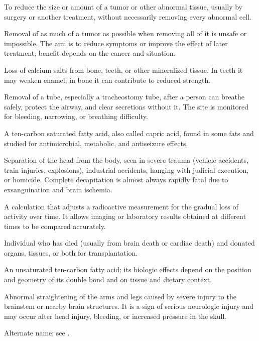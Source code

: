  To reduce the size or amount of a tumor or other abnormal tissue, usually by surgery or another treatment, without necessarily removing every abnormal cell.

 Removal of as much of a tumor as possible when removing all of it is unsafe or impossible. The aim is to reduce symptoms or improve the effect of later treatment; benefit depends on the cancer and situation.

 Loss of calcium salts from bone, teeth, or other mineralized tissue. In teeth it may weaken enamel; in bone it can contribute to reduced strength.

 Removal of a tube, especially a tracheostomy tube, after a person can breathe safely, protect the airway, and clear secretions without it. The site is monitored for bleeding, narrowing, or breathing difficulty.

 A ten-carbon saturated fatty acid, also called capric acid, found in some fats and studied for antimicrobial, metabolic, and antiseizure effects.

 Separation of the head from the body, seen in severe trauma (vehicle accidents, train
injuries, explosions), industrial accidents, hanging with judicial execution, or
homicide. Complete decapitation is almost always rapidly fatal due to exsanguination and
brain ischemia.

 A calculation that adjusts a radioactive measurement for the gradual loss of activity over time. It allows imaging or laboratory results obtained at different times to be compared accurately.

 Individual who has died (usually from brain death or cardiac death) and donated organs, tissues, or both for transplantation.

 An unsaturated ten-carbon fatty acid; its biologic effects depend on the position and geometry of its double bond and on tissue and dietary context.

 Abnormal straightening of the arms and legs caused by severe injury to the brainstem or nearby brain structures. It is a sign of serious neurologic injury and may occur after head injury, bleeding, or increased pressure in the skull.

 Alternate name; see .

